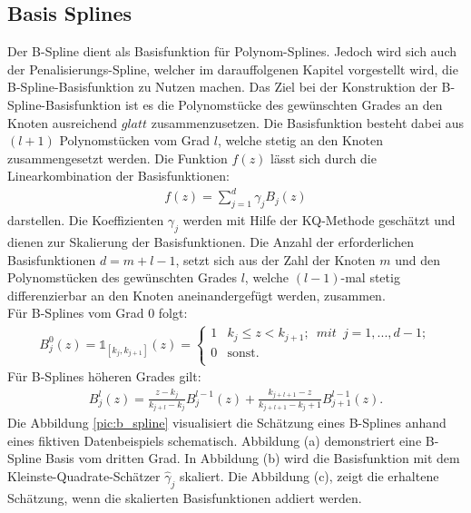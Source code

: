 \documentclass[12pt]{scrreprt}
\begin{document}
	\subsection{Basis Splines}
	Der B-Spline dient als Basisfunktion für Polynom-Splines. Jedoch wird sich auch der Penalisierungs-Spline, welcher im darauffolgenen Kapitel vorgestellt wird, die B-Spline-Basisfunktion zu Nutzen machen. Das Ziel bei der Konstruktion der B-Spline-Basisfunktion ist es die Polynomstücke des gewünschten Grades an den Knoten ausreichend $glatt$ zusammenzusetzen. Die Basisfunktion besteht dabei aus $(l+1)$ Polynomstücken vom Grad $l$, welche stetig an den Knoten zusammengesetzt werden. Die Funktion $f(z)$ lässt sich durch die Linearkombination der Basisfunktionen:
	\begin{align}
	f(z)=\sum_{j=1}^d\gamma_{j}B_{j}(z)
	\end{align}
	darstellen. Die Koeffizienten  $\gamma_{j}$ werden mit Hilfe der KQ-Methode geschätzt und dienen zur Skalierung der Basisfunktionen. Die Anzahl der erforderlichen Basisfunktionen $d = m+l-1$, setzt sich aus der Zahl der Knoten $m$ und den Polynomstücken des gewünschten Grades $l$, welche $(l-1)$-mal stetig differenzierbar an den Knoten aneinandergefügt werden, zusammen.  \\
	Für B-Splines vom Grad 0 folgt:
	\begin{align}
	B_{j}^0(z)= \mathbb{1}_{[k_{j},k_{j+1}]}(z)= 
	\begin{cases}
	1 & k_{j} \leq z<k_{j+1};\enspace mit\enspace j=1,...,d-1; \\
	0 & \text{sonst.} \\
	\end{cases}
	\end{align}
	Für B-Splines höheren Grades gilt:
	\begin{align}
	B_{j}^l(z)= \frac{z-k_{j}}{k_{j+l}-k_{j}}B_{j}^{l-1}(z)+
	\frac{k_{j+l+1}-z}{k_{j+l+1}-k_j+1}B_{j+1}^{l-1}(z).
	\end{align}
	Die Abbildung \ref{pic:b_spline} visualisiert die Schätzung eines B-Splines anhand eines fiktiven Datenbeispiels schematisch. Abbildung (a) demonstriert eine B-Spline Basis vom dritten Grad. In Abbildung (b) wird die Basisfunktion mit dem Kleinste-Quadrate-Schätzer $\hat\gamma_{j}$ skaliert. Die Abbildung (c), zeigt die erhaltene Schätzung, wenn die skalierten Basisfunktionen addiert werden.
\end{document}
